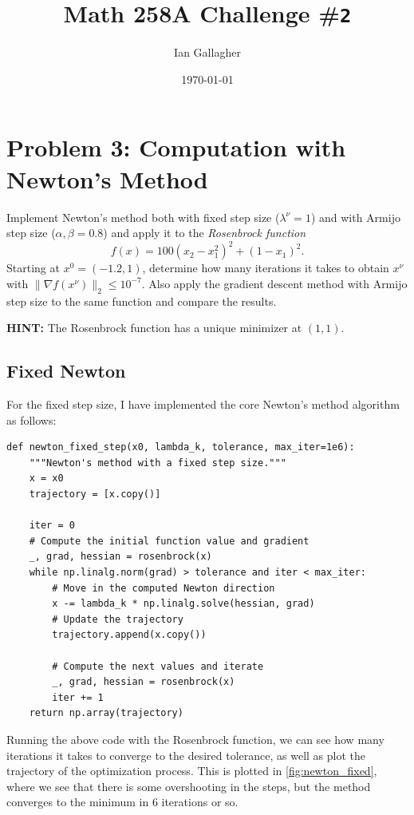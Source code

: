 \documentclass[11pt]{article}
\title{Math 258A Challenge \#\texttt{2}}
\author{Ian Gallagher}
\date{\today}
\theoremstyle{problemstyle}
\begin{document}
\maketitle

\section*{Problem 3: Computation with Newton's Method}
Implement Newton's method both with fixed step size ($\lambda^\nu = 1$) and with
Armijo step size ($\alpha, \beta = 0.8$) and apply it to the \textit{Rosenbrock
function} 
\[
f(x) = 100(x_2 - x_1^2)^2 + (1 - x_1)^2.
\]
Starting at $x^0 = (-1.2, 1)$, determine how many iterations it takes to obtain
$x^\nu$ with $\|\nabla f(x^\nu)\|_2 \leq 10^{-7}$. Also apply the gradient
descent method with Armijo step size to the same function and compare the
results.

\noindent
\textbf{HINT:} The Rosenbrock function has a unique minimizer at $(1,1)$.

\subsection*{Fixed Newton}
For the fixed step size, I have implemented the core Newton's method algorithm
as follows:
\begin{verbatim}
def newton_fixed_step(x0, lambda_k, tolerance, max_iter=1e6):
    """Newton's method with a fixed step size."""
    x = x0
    trajectory = [x.copy()]

    iter = 0
    # Compute the initial function value and gradient
    _, grad, hessian = rosenbrock(x)
    while np.linalg.norm(grad) > tolerance and iter < max_iter:
        # Move in the computed Newton direction
        x -= lambda_k * np.linalg.solve(hessian, grad)
        # Update the trajectory
        trajectory.append(x.copy())

        # Compute the next values and iterate
        _, grad, hessian = rosenbrock(x)
        iter += 1
    return np.array(trajectory)
\end{verbatim}
Running the above code with the Rosenbrock function, we can see how many
iterations it takes to converge to the desired tolerance, as well as plot the
trajectory of the optimization process. This is plotted in
\ref{fig:newton_fixed}, where we see that there is some overshooting in the
steps, but the method converges to the minimum in $6$ iterations or so.
\end{document}
